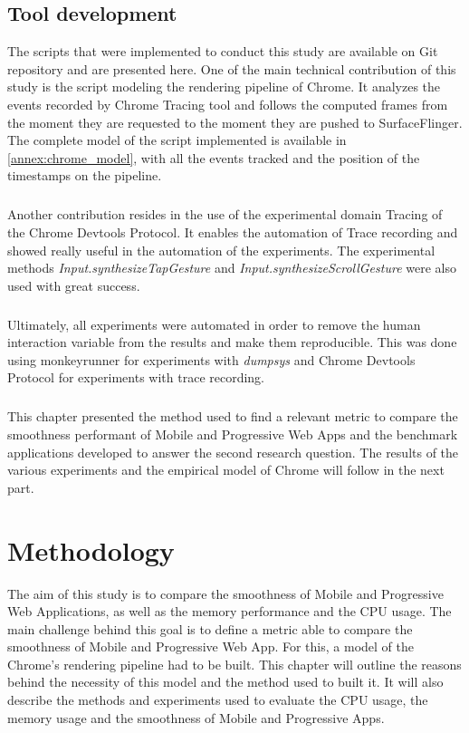 \section{Tool development}

The scripts that were implemented to conduct this study are available on Git repository and are presented here. One of the main technical contribution of this study is the script modeling the rendering pipeline of Chrome. It analyzes the events recorded by Chrome Tracing tool and follows the computed frames from the moment they are requested to the moment they are pushed to SurfaceFlinger. The complete model of the script implemented is available in \autoref{annex:chrome_model}, with all the events tracked and the position of the timestamps on the pipeline.
\paragraph{}
Another contribution resides in the use of the experimental domain Tracing of the Chrome Devtools Protocol. It enables the automation of Trace recording and showed really useful in the automation of the experiments. The experimental methods \textit{Input.synthesizeTapGesture} and \textit{Input.synthesizeScrollGesture} were also used with great success.
\paragraph{}
Ultimately, all experiments were automated in order to remove the human interaction variable from the results and make them reproducible. This was done using monkeyrunner for experiments with \textit{dumpsys} and Chrome Devtools Protocol for experiments with trace recording.

\paragraph{}
This chapter presented the method used to find a relevant metric to compare the smoothness performant of Mobile and Progressive Web Apps and the benchmark applications developed to answer the second research question. The results of the various experiments and the empirical model of Chrome will follow in the next part.
\fi

\chapter{Methodology}


The aim of this study is to compare the smoothness of Mobile and Progressive Web Applications, as well as the memory performance and the CPU usage. The main challenge behind this goal is to define a metric able to compare the smoothness of Mobile and Progressive Web App. For this, a model of the Chrome's rendering pipeline had to be built. This chapter will outline the reasons behind the necessity of this model and the method used to built it. It will also describe the methods and experiments used to evaluate the CPU usage, the memory usage and the smoothness of Mobile and Progressive Apps.

